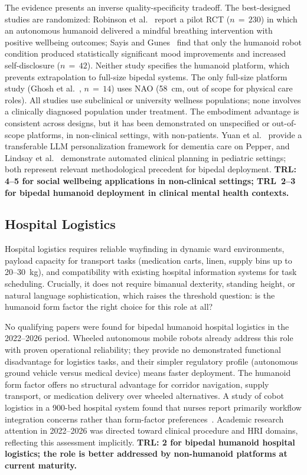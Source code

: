 \documentclass[acmjour]{acmart}
\begin{document}
The evidence presents an inverse quality-specificity tradeoff. The
best-designed studies are randomized: Robinson et al.~\cite{robinson2023brief}
report a pilot RCT ($n\,=\,230$) in which an autonomous humanoid delivered a
mindful breathing intervention with positive wellbeing outcomes; Sayis and
Gunes~\cite{sayis2024technology} find that only the humanoid robot condition
produced statistically significant mood improvements and increased self-disclosure
($n\,=\,42$). Neither study specifies the humanoid platform, which prevents
extrapolation to full-size bipedal systems. The only full-size platform study
(Ghosh et al.~\cite{ghosh2024usercentered}, $n\,=\,14$) uses NAO (58~cm, out of
scope for physical care roles). All studies use subclinical or university wellness
populations; none involves a clinically diagnosed population under treatment. The
embodiment advantage is consistent across designs, but it has been demonstrated
on unspecified or out-of-scope platforms, in non-clinical settings, with
non-patients. Yuan et al.~\cite{yuan2025integrating} provide a transferable LLM
personalization framework for dementia care on Pepper, and Lindsay et
al.~\cite{lindsay2022socially} demonstrate automated clinical planning in
pediatric settings; both represent relevant methodological precedent for bipedal
deployment. \textbf{TRL: 4--5 for social wellbeing applications in non-clinical
settings; TRL~2--3 for bipedal humanoid deployment in clinical mental health
contexts.}

\subsection{Hospital Logistics}
\label{sec:logistics}

Hospital logistics requires reliable wayfinding in dynamic ward environments,
payload capacity for transport tasks (medication carts, linen, supply bins up to
20--30~kg), and compatibility with existing hospital information systems for task
scheduling. Crucially, it does not require bimanual dexterity, standing height,
or natural language sophistication, which raises the threshold question: is the
humanoid form factor the right choice for this role at all?

No qualifying papers were found for bipedal humanoid hospital logistics in the
2022--2026 period. Wheeled autonomous mobile robots already address this role
with proven operational reliability; they provide no demonstrated functional
disadvantage for logistics tasks, and their simpler regulatory profile
(autonomous ground vehicle versus medical device) means faster deployment.
The humanoid form factor offers no structural advantage for corridor navigation,
supply transport, or medication delivery over wheeled alternatives. A study of cobot logistics in a 900-bed hospital system found that nurses
report primarily workflow integration concerns rather than form-factor
preferences~\cite{birkhoff2024integrating}. Academic research attention in
2022--2026 was directed toward clinical procedure and HRI domains, reflecting this assessment implicitly. \textbf{TRL: 2 for bipedal
humanoid hospital logistics; the role is better addressed by non-humanoid
platforms at current maturity.}
\end{document}
